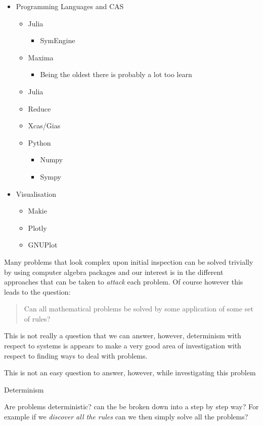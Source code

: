 \documentclass[11pt]{article}
\begin{document}
\begin{itemize}
\item Programming Languages and CAS
\begin{itemize}
\item Julia
\begin{itemize}
\item SymEngine
\end{itemize}
\item Maxima
\begin{itemize}
\item Being the oldest there is probably a lot too learn
\end{itemize}
\item Julia
\item Reduce
\item Xcas/Gias
\item Python
\begin{itemize}
\item Numpy
\item Sympy
\end{itemize}
\end{itemize}
\item Visualisation
\begin{itemize}
\item Makie
\item Plotly
\item GNUPlot
\end{itemize}
\end{itemize}


Many problems that look complex upon initial inspection can be solved trivially
by using computer algebra packages and our interest is in the different
approaches that can be taken to \emph{attack} each problem. Of course however this leads to the question:


\begin{quote}
Can all mathematical problems be solved by some application of some set of rules?
\end{quote}

This is not really a question that we can answer, however, determinism with
respect to systems is appears to make a very good area of investigation with respect to finding ways to deal with problems.

This is not an easy question to answer, however, while investigating this problem



Determinism

Are problems deterministic? can the be broken down into a step by step way? For
example if we \emph{discover all the rules} can we then simply solve all the problems?
\end{document}
